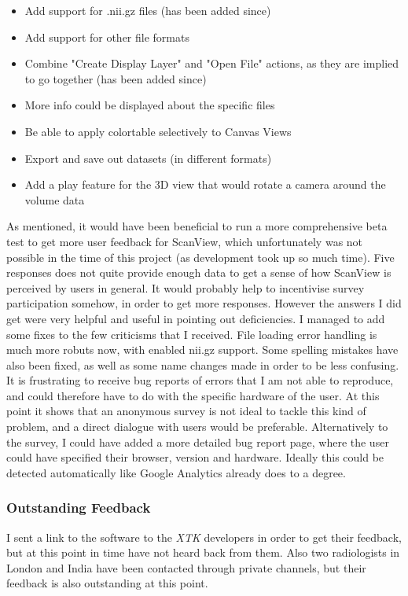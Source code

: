 \documentclass[a4paper,11pt,twoside]{article}
\begin{document}
\begin{itemize}
\item Add support for .nii.gz files (has been added since)
\item Add support for other file formats
\item Combine "Create Display Layer" and "Open File" actions, as they are implied to go together (has been added since)
\item More info could be displayed about the specific files
\item Be able to apply colortable selectively to Canvas Views
\item Export and save out datasets (in different formats)
\item Add a play feature for the 3D view that would rotate a camera around the volume data
\end{itemize}

 
As mentioned, it would have been beneficial to run a more comprehensive beta test to get more user feedback for ScanView, which unfortunately was not possible in the time of this project (as development took up so much time). Five responses does not quite provide enough data to get a sense of how ScanView is perceived by users in general. It would probably help to incentivise survey participation somehow, in order to get more responses. However the answers I did get were very helpful and useful in pointing out deficiencies. I managed to add some fixes to the few criticisms that I received. File loading error handling is much more robuts now, with enabled nii.gz support. Some spelling mistakes have also been fixed, as well as some name changes made in order to be less confusing. It is frustrating to receive bug reports of errors that I am not able to reproduce, and could therefore have to do with the specific hardware of the user. At this point it shows that an anonymous survey is not ideal to tackle this kind of problem, and a direct dialogue with users would be preferable. Alternatively to the survey, I could have added a more detailed bug report page, where the user could have specified their browser, version and hardware. Ideally this could be detected automatically like Google Analytics already does to a degree.


\subsubsection{Outstanding Feedback}

I sent a link to the software to the \textit{XTK} developers in order to get their feedback, but at this point in time have not heard back from them. Also two radiologists in London and India have been contacted through private channels, but their feedback is also outstanding at this point.
\end{document}
